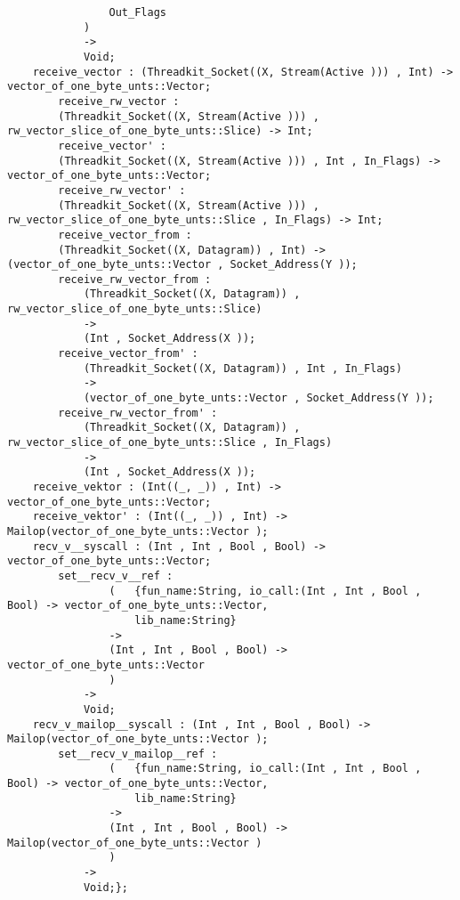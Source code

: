 \begin{verbatim}
                Out_Flags
            )
            ->
            Void;
    receive_vector : (Threadkit_Socket((X, Stream(Active ))) , Int) -> vector_of_one_byte_unts::Vector;
        receive_rw_vector :
        (Threadkit_Socket((X, Stream(Active ))) , rw_vector_slice_of_one_byte_unts::Slice) -> Int;
        receive_vector' :
        (Threadkit_Socket((X, Stream(Active ))) , Int , In_Flags) -> vector_of_one_byte_unts::Vector;
        receive_rw_vector' :
        (Threadkit_Socket((X, Stream(Active ))) , rw_vector_slice_of_one_byte_unts::Slice , In_Flags) -> Int;
        receive_vector_from :
        (Threadkit_Socket((X, Datagram)) , Int) -> (vector_of_one_byte_unts::Vector , Socket_Address(Y ));
        receive_rw_vector_from :
            (Threadkit_Socket((X, Datagram)) , rw_vector_slice_of_one_byte_unts::Slice)
            ->
            (Int , Socket_Address(X ));
        receive_vector_from' :
            (Threadkit_Socket((X, Datagram)) , Int , In_Flags)
            ->
            (vector_of_one_byte_unts::Vector , Socket_Address(Y ));
        receive_rw_vector_from' :
            (Threadkit_Socket((X, Datagram)) , rw_vector_slice_of_one_byte_unts::Slice , In_Flags)
            ->
            (Int , Socket_Address(X ));
    receive_vektor : (Int((_, _)) , Int) -> vector_of_one_byte_unts::Vector;
    receive_vektor' : (Int((_, _)) , Int) -> Mailop(vector_of_one_byte_unts::Vector );
    recv_v__syscall : (Int , Int , Bool , Bool) -> vector_of_one_byte_unts::Vector;
        set__recv_v__ref :
                (   {fun_name:String, io_call:(Int , Int , Bool , Bool) -> vector_of_one_byte_unts::Vector,
                    lib_name:String}
                ->
                (Int , Int , Bool , Bool) -> vector_of_one_byte_unts::Vector
                )
            ->
            Void;
    recv_v_mailop__syscall : (Int , Int , Bool , Bool) -> Mailop(vector_of_one_byte_unts::Vector );
        set__recv_v_mailop__ref :
                (   {fun_name:String, io_call:(Int , Int , Bool , Bool) -> vector_of_one_byte_unts::Vector,
                    lib_name:String}
                ->
                (Int , Int , Bool , Bool) -> Mailop(vector_of_one_byte_unts::Vector )
                )
            ->
            Void;};
\end{verbatim}
